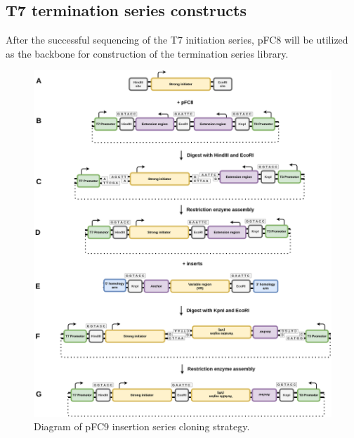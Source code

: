 \documentclass[11pt]{article}
\begin{document}
\subsection{T7 termination series constructs}

After the successful sequencing of the T7 initiation series, pFC8 will be utilized as the backbone for construction of the termination series library. 

\begin{figure}[H]
	\includegraphics[width=15cm]{images/cloning_diagrams/construct_diagrams-T7-termination-series.png}
	\centering
	\caption{Diagram of pFC9 insertion series cloning strategy.}
	\label{clone:T7-term}
	
\end{figure}
\end{document}
